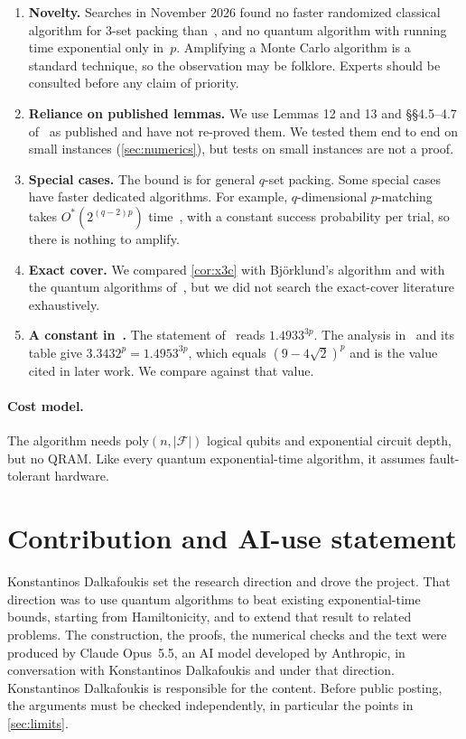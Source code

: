\documentclass[11pt,a4paper]{article}
\theoremstyle{plain}
\theoremstyle{remark}
\newcommand{\Ostar}{O^{*}}
\newcommand{\F}{\mathcal{F}}
\begin{document}
\begin{enumerate}[nosep]
  \item \textbf{Novelty.} Searches in November 2026 found no faster randomized classical algorithm for 3-set packing than~\cite{bhkk}, and no quantum algorithm with running time exponential only in~$p$. Amplifying a Monte Carlo algorithm is a standard technique, so the observation may be folklore. Experts should be consulted before any claim of priority.
  \item \textbf{Reliance on published lemmas.} We use Lemmas 12 and 13 and \S\S 4.5--4.7 of~\cite{bhkk} as published and have not re-proved them. We tested them end to end on small instances (\cref{sec:numerics}), but tests on small instances are not a proof.
  \item \textbf{Special cases.} The bound is for general $q$-set packing. Some special cases have faster dedicated algorithms. For example, $q$-dimensional $p$-matching takes $\Ostar(2^{(q-2)p})$ time~\cite[Theorem~5]{bhkk}, with a constant success probability per trial, so there is nothing to amplify.
  \item \textbf{Exact cover.} We compared \cref{cor:x3c} with Björklund's algorithm and with the quantum algorithms of~\cite{ambainis,gaspersli}, but we did not search the exact-cover literature exhaustively.
  \item \textbf{A constant in~\cite{bhkk}.} The statement of~\cite[Theorem~2]{bhkk} reads $1.4933^{3p}$. The analysis in~\cite[\S 4.7]{bhkk} and its table give $3.3432^p = 1.4953^{3p}$, which equals $(9-4\sqrt2)^p$ and is the value cited in later work. We compare against that value.
\end{enumerate}

\paragraph{Cost model.}
The algorithm needs $\mathrm{poly}(n,|\F|)$ logical qubits and exponential circuit depth, but no QRAM. Like every quantum exponential-time algorithm, it assumes fault-tolerant hardware.

\section*{Contribution and AI-use statement}

Konstantinos Dalkafoukis set the research direction and drove the project. That direction was to use quantum algorithms to beat existing exponential-time bounds, starting from Hamiltonicity, and to extend that result to related problems. The construction, the proofs, the numerical checks and the text were produced by Claude Opus~5.5, an AI model developed by Anthropic, in conversation with Konstantinos Dalkafoukis and under that direction. Konstantinos Dalkafoukis is responsible for the content. Before public posting, the arguments must be checked independently, in particular the points in \cref{sec:limits}.
\end{document}
